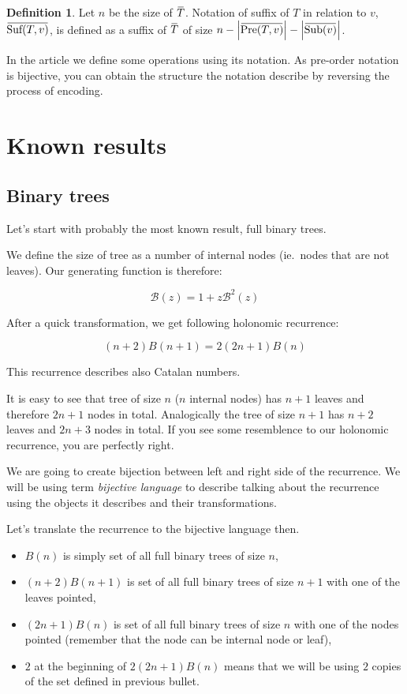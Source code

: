 \documentclass[final]{article}
\theoremstyle{definition}
\newtheorem{definition}{Definition}[subsection]
\theoremstyle{remark}
\newcommand{\ols}[1]{\mskip.5\thinmuskip\overline{\mskip-.5\thinmuskip {#1} \mskip-.5\thinmuskip}\mskip.5\thinmuskip} %
\newcommand{\gf}[1]{\ensuremath{\mathcal{#1}}}
\newcommand{\enc}[1]{\ensuremath{\ols{#1}}}
\newcommand{\size}[1]{\ensuremath{\left|#1\right|}}
\DeclareMathOperator{\tSub}{\text{Sub}}
\DeclareMathOperator{\tPre}{\text{Pre}}
\DeclareMathOperator{\tSuf}{\text{Suf}}
\begin{document}
\begin{definition}
    Let \(n\) be the size of \enc{T}. Notation of suffix of \(T\) in relation to \(v\), \(\enc{\tSuf(T, v)}\), is defined as a suffix of \enc{T} of size \(n - \size{\enc{\tPre(T, v)}} - \size{\enc{\tSub(v)}}\).
\end{definition}

In the article we define some operations using its notation. As pre-order notation is bijective, you can obtain the structure the notation describe by reversing the process of encoding.

\section{Known results}%
\label{sec:known_results}

\subsection{Binary trees}%
\label{sub:binary_trees}



Let's start with probably the most known result, full binary trees\cite{binary}.

We define the size of tree as a number of internal nodes (ie.\ nodes that are not leaves). Our generating function is therefore:

\[\gf{B}(z) = 1 + z\gf{B}^2(z)\]

After a quick transformation, we get following holonomic recurrence:

\[(n + 2)B(n + 1) = 2 (2n + 1)B(n)\]

This recurrence describes also Catalan numbers.

It is easy to see that tree of size \(n\) (\(n\) internal nodes) has \(n + 1\) leaves and therefore \(2n + 1\) nodes in total. Analogically the tree of size \(n + 1\) has \(n + 2\) leaves and \(2n + 3\) nodes in total. If you see some resemblence to our holonomic recurrence, you are perfectly right.

We are going to create bijection between left and right side of the recurrence. We will be using term \textit{bijective language} to describe talking about the recurrence using the objects it describes and their transformations.

Let's translate the recurrence to the bijective language then.
\begin{itemize}
    \item \(B(n)\) is simply set of all full binary trees of size \(n\),
    \item \((n + 2) B(n + 1)\) is set of all full binary trees of size \(n + 1\) with one of the leaves pointed,
    \item \((2n + 1) B(n)\) is set of all full binary trees of size \(n\) with one of the nodes pointed (remember that the node can be internal node or leaf),
    \item \(2\) at the beginning of \(2 (2n + 1) B(n)\) means that we will be using \(2\) copies of the set defined in previous bullet.
\end{itemize}
\end{document}
